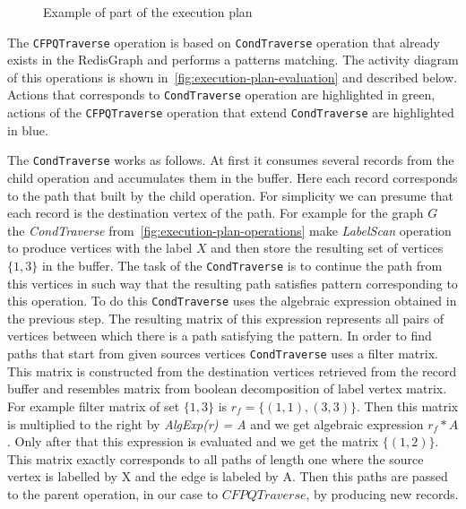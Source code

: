 \begin{figure}[h]
    \centering        
    \caption{Example of part of the execution plan}
    \label{fig:execution-plan-operations}
\end{figure}

The \lstinline{CFPQTraverse} operation is based on \lstinline{CondTraverse} operation that already exists in the RedisGraph and performs a patterns matching. The activity diagram of this operations is shown in~\autoref{fig:execution-plan-evaluation} and described below. Actions that corresponds to \lstinline{CondTraverse} operation are highlighted in green, actions of the \lstinline{CFPQTraverse} operation that extend \lstinline{CondTraverse} are highlighted in blue.

The \lstinline{CondTraverse} works as follows. At first it consumes several records from the child operation and accumulates them in the buffer. Here each record corresponds to the path that built by the child operation. For simplicity we can presume that each record is the destination vertex of the path. For example for the graph $G$ the \textit{CondTraverse} from~\autoref{fig:execution-plan-operations} make \textit{LabelScan} operation to produce vertices with the label $X$ and then store the resulting set of vertices $\{1, 3\}$ in the buffer. The task of the \lstinline{CondTraverse} is to continue the path from this vertices in such way that the resulting path satisfies pattern corresponding to this operation. To do this \lstinline{CondTraverse} uses the algebraic expression obtained in the previous step. The resulting matrix of this expression represents all pairs of vertices between which there is a path satisfying the pattern. In order to find paths that start from given sources vertices \lstinline{CondTraverse} uses a filter matrix. This matrix is constructed from the destination vertices retrieved from the record buffer and resembles matrix from boolean decomposition of label vertex matrix. For example filter matrix of set $\{1, 3\}$ is $ r_{f}=\{(1, 1), (3, 3)\}$. Then this matrix is multiplied to the right by \textit{AlgExp(r) = A} and we get algebraic expression $r_{f} * A$. Only after that this expression is evaluated and we get the matrix $\{(1, 2)\}$. This matrix exactly corresponds to all paths of length one where the source vertex is labelled by X and the edge is labeled by A. Then this paths are passed to the parent operation, in our case to $CFPQTraverse$, by producing new records.

